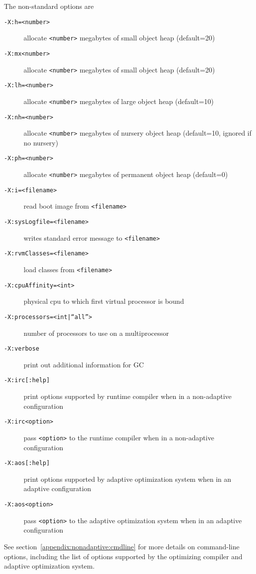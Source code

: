 The non-standard options are

\begin{description}
\item[{\tt -X:h=<number>}]
allocate {\tt <number>} megabytes of small object heap (default=20)

\item[{\tt -X:mx<number>}]
allocate {\tt <number>} megabytes of small object heap (default=20)

\item[{\tt -X:lh=<number>}]
allocate {\tt <number>} megabytes of large object heap (default=10)

\item[{\tt -X:nh=<number>}]
allocate {\tt <number>} megabytes of nursery object heap (default=10,
ignored if no nursery)

\item[{\tt -X:ph=<number>}]
allocate {\tt <number>} megabytes of permanent object heap (default=0)

\item[{\tt -X:i=<filename>}]
read boot image from {\tt <filename>}

\item[{\tt -X:sysLogfile=<filename>}]
writes standard error message to {\tt <filename>}

\item[{\tt -X:rvmClasses=<filename>}]
load classes from {\tt <filename>}

\item[{\tt -X:cpuAffinity=<int>}]
physical cpu to which first virtual processor is bound

\item[{\tt -X:processors=<int|``all''>}]
number of processors to use on a multiprocessor

\item[{\tt -X:verbose}]
print out additional information for GC

\item[{\tt -X:irc[:help]}]
print options supported by runtime compiler when in a non-adaptive configuration 

\item[{\tt -X:irc<option>}]
pass {\tt <option>} to the runtime compiler when in a non-adaptive configuration 

\item[{\tt -X:aos[:help]}]
print options supported by adaptive optimization system when in an
adaptive configuration

\item[{\tt -X:aos<option>}]
pass {\tt <option>} to the adaptive optimization system when in an adaptive configuration

\end{description}

See section~\ref{appendix:nonadaptive:cmdline} for more details on 
command-line options, including the list of options supported by the 
optimizing compiler and adaptive optimization system.


